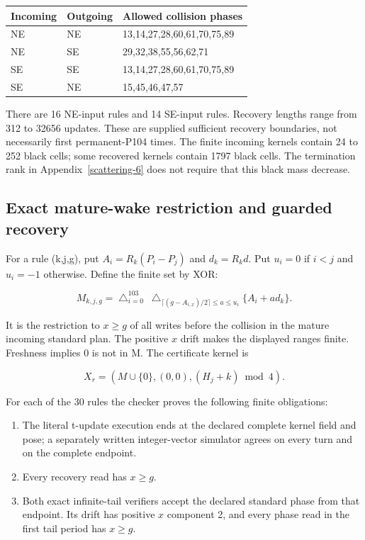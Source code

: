 \begin{center}
\begin{tabular}{@{}lll@{}}
\toprule\noalign{}
Incoming & Outgoing & Allowed collision phases \\
\midrule\noalign{}
NE & NE & 13,14,27,28,60,61,70,75,89 \\
NE & SE & 29,32,38,55,56,62,71 \\
SE & SE & 13,14,27,28,60,61,70,75,89 \\
SE & NE & 15,45,46,47,57 \\
\bottomrule
\end{tabular}
\end{center}

There are 16 NE-input rules and 14 SE-input rules. Recovery lengths
range from 312 to 32656 updates. These are supplied sufficient recovery
boundaries, not necessarily first permanent-P104 times. The finite
incoming kernels contain 24 to 252 black cells; some recovered kernels
contain 1797 black cells. The termination rank in Appendix~\ref{scattering-6}
does not require that this
black mass decrease.

\subsection{Exact mature-wake restriction and guarded
recovery}\label{scattering-3}

For a rule (k,j,g), put $A_i=R_k(P_i-P_j)$
and $d_k=R_kd$. Put $u_i=0$ if $i<j$ and $u_i=-1$ otherwise. Define the finite set by XOR:

\[
M_{k,j,g}=\mathop{\triangle}_{i=0}^{103}\ \mathop{\triangle}_{\lceil(g-A_{i,x})/2\rceil\le a\le u_i}\{A_i+ad_k\}.
\]

It is the restriction to $x\ge g$ of all writes before the
collision in the mature incoming standard plan. The positive $x$ drift
makes the displayed ranges finite. Freshness implies 0 is not in M. The
certificate kernel is

\[
X_r=(M\cup\{0\},(0,0),(H_j+k)\bmod4).
\]

For each of the 30 rules the checker proves the following finite
obligations:

\begin{enumerate}
\def\labelenumi{\arabic{enumi}.}
\tightlist
\item
  The literal t-update execution ends at the declared complete kernel
  field and pose; a separately written integer-vector simulator agrees
  on every turn and on the complete endpoint.
\item
  Every recovery read has $x\ge g$.
\item
  Both exact infinite-tail verifiers accept the declared standard phase
  from that endpoint. Its drift has positive $x$ component 2, and every
  phase read in the first tail period has $x\ge g$.
\end{enumerate}

